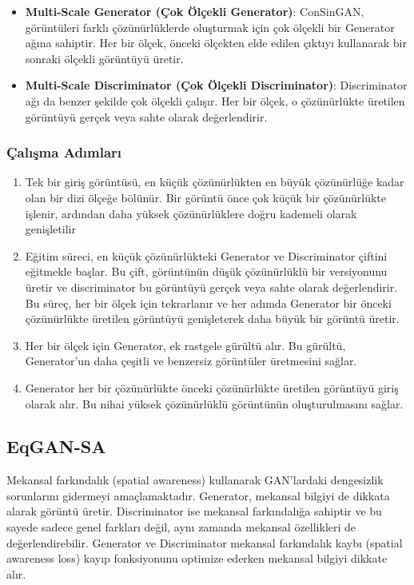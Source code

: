 \begin{itemize}
    \item \textbf{Multi-Scale Generator (Çok Ölçekli Generator)}: ConSinGAN, görüntüleri farklı çözünürlüklerde oluşturmak için çok ölçekli bir Generator ağına sahiptir. Her bir ölçek, önceki ölçekten elde edilen çıktıyı kullanarak bir sonraki ölçekli görüntüyü üretir.
    \item \textbf{Multi-Scale Discriminator (Çok Ölçekli Discriminator)}: Discriminator ağı da benzer şekilde çok ölçekli çalışır. Her bir ölçek, o çözünürlükte üretilen görüntüyü gerçek veya sahte olarak değerlendirir.
\end{itemize}

\subsubsection{Çalışma Adımları}

\begin{enumerate}
    \item Tek bir giriş görüntüsü, en küçük çözünürlükten en büyük çözünürlüğe kadar olan bir dizi ölçeğe bölünür. Bir görüntü önce çok küçük bir çözünürlükte işlenir, ardından daha yüksek çözünürlüklere doğru kademeli olarak genişletilir
    \item Eğitim süreci, en küçük çözünürlükteki Generator ve Discriminator çiftini eğitmekle başlar. Bu çift, görüntünün düşük çözünürlüklü bir versiyonunu üretir ve discriminator bu görüntüyü gerçek veya sahte olarak değerlendirir. Bu süreç, her bir ölçek için tekrarlanır ve her adımda Generator bir önceki çözünürlükte üretilen görüntüyü genişleterek daha büyük bir görüntü üretir.
    \item Her bir ölçek için Generator, ek rastgele gürültü alır. Bu gürültü, Generator'un daha çeşitli ve benzersiz görüntüler üretmesini sağlar.
    \item Generator her bir çözünürlükte önceki çözünürlükte üretilen görüntüyü giriş olarak alır. Bu nihai yüksek çözünürlüklü görüntünün oluşturulmasını sağlar.
\end{enumerate}

\newpage

\subsection{EqGAN-SA}

Mekansal farkındalık (spatial awareness) kullanarak GAN'lardaki dengesizlik sorunlarını gidermeyi amaçlamaktadır. Generator, mekansal bilgiyi de dikkata alarak görüntü üretir. Discriminator ise mekansal farkındalığa sahiptir ve bu sayede sadece genel farkları değil, aynı zamanda mekansal özellikleri de değerlendirebilir. Generator ve Discriminator mekansal farkındalık kaybı (spatial awareness loss) kayıp fonksiyonunu optimize ederken mekansal bilgiyi dikkate alır.

